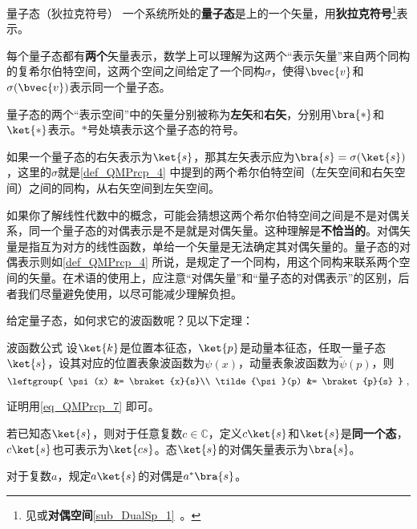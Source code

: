 \begin{definition}{量子态（狄拉克符号）}\label{def_QMPrcp_4}
一个系统所处的\textbf{量子态}是上的一个矢量，用\textbf{狄拉克符号}\footnote{见或\textbf{对偶空间}\autoref{sub_DualSp_1}~。}表示。

每个量子态都有\textbf{两个}矢量表示，数学上可以理解为这两个“表示矢量”来自两个同构的复希尔伯特空间，这两个空间之间给定了一个同构$\sigma$，使得$\bvec{v}$和$\sigma(\bvec{v})$表示同一个量子态。

量子态的两个“表示空间”中的矢量分别被称为\textbf{左矢}和\textbf{右矢}，分别用$\bra{*}$和$\ket{*}$表示。$*$号处填表示这个量子态的符号。

\end{definition}


如果一个量子态的右矢表示为$\ket{s}$，那其左矢表示应为$\bra{s}=\sigma(\ket{s})$，这里的$\sigma$就是\autoref{def_QMPrcp_4} 中提到的两个希尔伯特空间（左矢空间和右矢空间）之间的同构，从右矢空间到左矢空间。

如果你了解线性代数中的概念，可能会猜想这两个希尔伯特空间之间是不是对偶关系，同一个量子态的对偶表示是不是就是对偶矢量。这种理解是\textbf{不恰当的}。对偶矢量是指互为对方的线性函数，单给一个矢量是无法确定其对偶矢量的。量子态的对偶表示则如\autoref{def_QMPrcp_4} 所说，是规定了一个同构，用这个同构来联系两个空间的矢量。在术语的使用上，应注意“对偶矢量”和“量子态的对偶表示”的区别，后者我们尽量避免使用，以尽可能减少理解负担。

给定量子态，如何求它的波函数呢？见以下定理：

\begin{theorem}{波函数公式}
设$\ket{k}$是位置本征态，$\ket{p}$是动量本征态，任取一量子态$\ket{s}$，设其对应的位置表象波函数为$\psi(x)$，动量表象波函数为$\tilde{\psi}(p)$，则
\begin{equation}\label{eq_QMPrcp_8}
\leftgroup{
    \psi(x) &= \braket{x}{s}\\
    \tilde{\psi}(p) &= \braket{p}{s}
}~,
\end{equation}
\end{theorem}

证明用\autoref{eq_QMPrcp_7} 即可。

\begin{definition}{}\label{def_QMPrcp_2}
若已知态$\ket{s}$，则对于任意复数$c\in\mathbb{C}$，定义$c\ket{s}$和$\ket{s}$是\textbf{同一个态}，$c\ket{s}$也可表示为$\ket{cs}$。态$\ket{s}$的对偶矢量表示为$\bra{s}$。

对于复数$a$，规定$a\ket{s}$的对偶是$a^*\bra{s}$。
\end{definition}

